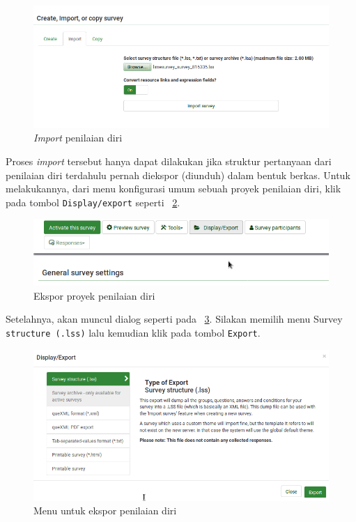 \begin{figure}
  \begin{center}
    \includegraphics[scale=.5]{pics/importSurvey.png}
    \caption{\textit{Import} penilaian diri}
    \label{fig:import}
  \end{center}
\end{figure}

Proses \textit{import} tersebut hanya dapat dilakukan jika struktur pertanyaan dari penilaian diri terdahulu pernah diekspor (diunduh) dalam bentuk berkas. Untuk melakukannya, dari menu konfigurasi umum sebuah proyek penilaian diri, klik pada tombol \texttt{Display/export} seperti \figurename~\ref{fig:exportSurvey}. 

\begin{figure}
  \begin{center}
    \includegraphics[scale=.5]{pics/exportSurvey.png}
    \caption{Ekspor proyek penilaian diri}
    \label{fig:exportSurvey}
  \end{center}
\end{figure}

Setelahnya, akan muncul dialog seperti pada \figurename~\ref{fig:exportSurvey1}. Silakan memilih menu Survey \texttt{structure (.lss)} lalu kemudian klik pada tombol \texttt{Export}.

\begin{figure}
  \begin{center}
    \includegraphics[scale=.5]{pics/exportSurvey1.png}
    \caption{Menu untuk ekspor penilaian diri}
    \label{fig:exportSurvey1}
  \end{center}
\end{figure}

